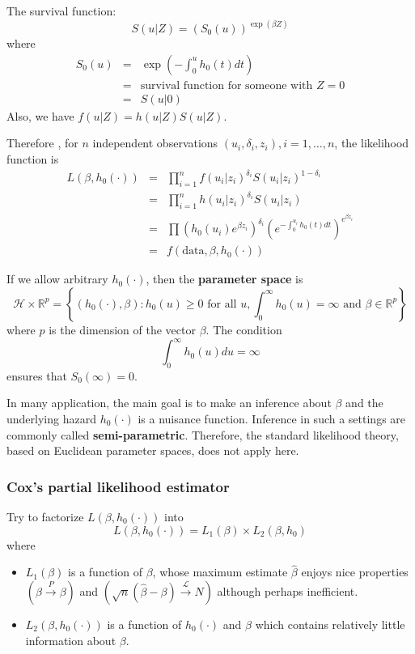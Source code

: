\documentclass[11pt,addpoints,answers]{exam}
\begin{document}
\begin{CJK*}{UTF8}{gbsn}
The survival function:
$$
S(u|Z) = (S_0(u))^{\exp(\beta Z)}
$$
where 
$$
\begin{array}{lcl}
S_0(u) &=& \exp(-\int_0^u h_0(t) dt)\\
&=& \mbox{survival function for someone with }Z=0\\  
&=& S(u|0)
\end{array}
$$
Also, we have $f(u|Z) = h(u|Z) S(u|Z)$.

Therefore , for $n$ independent observations $(u_i, \delta_i, z_i), i=1,\dots, n$, the 
likelihood function is
$$
\begin{array}{lcl}
L(\beta, h_0(\cdot)) &=& \prod_{i=1}^n f(u_i|z_i)^{\delta_i} S(u_i | z_i)^{1-\delta_i}\\
&=& \prod_{i=1}^n h(u_i|z_i)^{\delta_i} S(u_i|z_i)\\
&=& \prod (h_0(u_i)e^{\beta z_i})^{\delta_i} (e^{-\int_0^{u_i} h_0(t)dt})^{e^{\beta z_i}}\\
&=& f(\mbox{data}, \beta, h_0(\cdot))
\end{array}
$$

If we allow arbitrary $h_0(\cdot)$, then the \textbf{parameter space} is
$$
\mathcal{H} \times \mathbb{R}^p = \left\{ (h_0(\cdot), \beta): h_0(u) \ge 0 \mbox{ for all }u, \int_0^{\infty} h_0(u) = \infty \mbox{ and } \beta \in \mathbb{R}^p \right\}
$$
where $p$ is the dimension of the vector $\beta$. The condition
$$
\int_0^{\infty} h_0(u) du = \infty
$$
ensures that $S_0(\infty) = 0$.

In many application, the main goal is to make an inference about $\beta$ and the 
underlying hazard $h_0(\cdot)$ is a nuisance function. Inference in such a settings 
are commonly called \textbf{semi-parametric}. Therefore, the standard likelihood 
theory, based on Euclidean parameter spaces, does not apply here.

\subsubsection{Cox's partial likelihood estimator}

Try to factorize $L(\beta, h_0(\cdot))$ into
$$
L(\beta, h_0(\cdot)) = L_1(\beta) \times L_2(\beta, h_0)
$$
where
\begin{itemize}
	\item $L_1(\beta)$ is a function of $\beta$, whose maximum estimate $\hat{\beta}$ enjoys 
		nice properties $(\hat{\beta} \stackrel{P}{\to} \beta)$ and $(\sqrt{n} 
		(\hat{\beta} - \beta) \stackrel{\mathcal{L}}{\to} N)$ although perhaps 
		inefficient.
	\item $L_2(\beta,h_0(\cdot))$ is a function of $h_0(\cdot)$ and $\beta$ which 
		contains relatively little information about $\beta$.
\end{itemize}


\end{CJK*}
\end{document}
